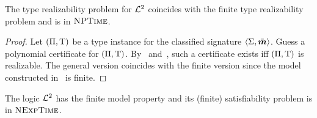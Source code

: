 \begin{proposition}
The type realizability problem for $\mathcal{L}^{2}$ coincides with the finite type
realizability problem and is in $\text{\normalfont{\scshape NPTime}}$.
\end{proposition}
\begin{proof}
Let $(\Pi,\mathrm{T})$ be a type instance for the classified signature
$\left\langle \mathrm{\Sigma},\bar{\bm{m}} \right\rangle$. Guess a polynomial certificate for $(\Pi,\mathrm{T})$.
By~ and~, such a certificate exists
iff $(\Pi,\mathrm{T})$ is realizable.
The general version coincides with the finite version since the model
constructed in~ is finite.
\end{proof}
\begin{corollary}
The logic $\mathcal{L}^{2}$ has the finite model property and its (finite) satisfiability
problem is in $\text{\normalfont{\scshape NExpTime}}$.
\end{corollary}